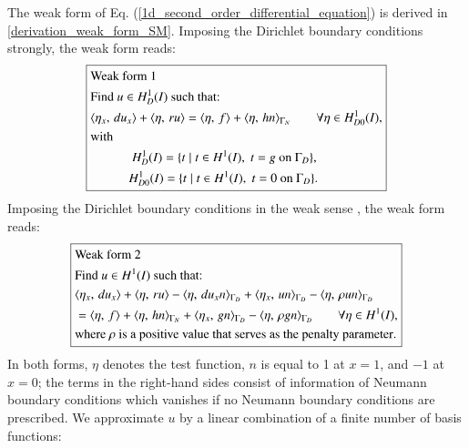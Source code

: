 \documentclass[review,3p]{elsarticle}
\begin{document}
The weak form of Eq. (\ref{1d_second_order_differential_equation}) is derived in \ref{derivation_weak_form_SM}. Imposing the Dirichlet boundary conditions strongly, the weak form reads:
\begin{equation}
\centering
\boxed{ 
\begin{aligned}
&\text{Weak~form}~ 1 ~~~~~~~~~\\
&\text{Find $u \in H _D^1 (I)$ such that:} \\
&\langle {\eta} _{ x }, \, du _{ x } \rangle + \langle\eta, \, ru\rangle = \langle\eta, \, f \rangle + \langle\eta, \, hn\rangle_{\Gamma _N} \qquad \forall \eta \in H _{D0}^1 (I),\\
&\text{with} \\
&~~~~~~~~~~~~~H_{D} ^1 (I) = \{t \; | \; t \in H^1 (I), \; t = g \text{ on } \Gamma _D \},  \\
&~~~~~~~~~~~~H_{D0} ^1 (I) = \{t \; | \; t \in H^1 (I), \; t = 0 \text{ on } \Gamma _D\}.\\
\end{aligned}		\label{1D_general_SM_weak_form_Diri_strong} 
}
\end{equation}
Imposing the Dirichlet boundary conditions in the weak sense \cite{freund1995weakly}, the weak form reads:
\begin{equation}
\centering
\boxed{
\begin{aligned}
&\text{Weak~form}~ 2 ~~~~~~~~~\\
&\text{Find } u \in H ^1 (I) \text{ such that:}\\
& \langle { \eta} _{ x }, \, du_x \rangle + \langle \eta, \, ru \rangle - \langle \eta, \, du_x n \rangle_{\Gamma _D} + \langle \eta _x, \, u n \rangle_{\Gamma _D} - \langle \eta, \, \rho u n \rangle_{\Gamma _D} \\ 
&= \langle \eta, \, f \rangle + \langle \eta, \, h n \rangle_{\Gamma _N} + \langle \eta _x, \, g n \rangle_{\Gamma _D} - \langle \eta, \, \rho g n \rangle_{\Gamma _D} \qquad \forall \eta \in H ^1 (I), \\
&\text{where } \rho \text{ is a } \text{{positive}} \text{ value that serves as the penalty parameter}.
\end{aligned}	\label{1D_general_SM_weak_form_Diri_weak}}
\end{equation}
In both forms, $\eta$ denotes the test function, $n$ is equal to 1 at $x=1$, and $-1$ at $x=0$; the terms in the right-hand sides consist of information of Neumann boundary conditions which vanishes if no Neumann boundary conditions are prescribed. We approximate $u$ by a linear combination of a finite number of basis functions:
\end{document}
